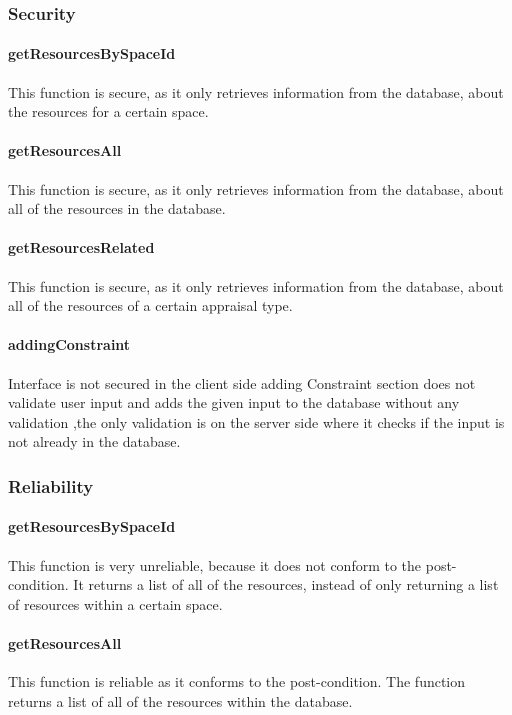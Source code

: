 \documentclass[a4paper]{article}
\begin{document}
\subsubsection {Security}

\paragraph{getResourcesBySpaceId}
This function is secure, as it only retrieves information from the database, about the resources for a certain space.

\paragraph{getResourcesAll}
This function is secure, as it only retrieves information from the database, about all of the resources in the database.

\paragraph{getResourcesRelated}
This function is secure, as it only retrieves information from the database, about all of the resources of a certain appraisal type.

\paragraph{addingConstraint}
Interface is not secured in the client side adding Constraint section does not validate user input and adds the given input to the database without any validation ,the only validation is on the server side where it checks if the input is not already in the database.

\subsubsection {Reliability}

\paragraph{getResourcesBySpaceId}
This function is very unreliable, because it does not conform to the post-condition. It returns a list of all of the resources, instead of only returning a list of resources within a certain space.

\paragraph{getResourcesAll}
This function is reliable as it conforms to the post-condition. The function returns a list of all of the resources within the database.
\end{document}
